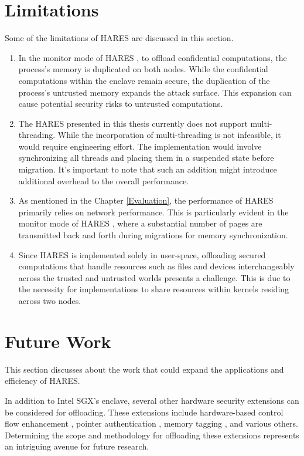 \documentclass[article, doublespace,nopageskip]{VTthesis} %
\newcommand{\monitor}{HARES }
\begin{document}
    \section{Limitations}
    Some of the limitations of \monitor are discussed in this section. 
    
    \begin{enumerate}
        \item In the monitor mode of \monitor, to offload confidential computations, the process's memory is duplicated on both nodes. While the confidential computations within the enclave remain secure, the duplication of the process's untrusted memory expands the attack surface. This expansion can cause potential security risks to untrusted computations.
        \item The \monitor presented in this thesis currently does not support multi-threading. While the incorporation of multi-threading is not infeasible, it would require engineering effort. The implementation would involve synchronizing all threads and placing them in a suspended state before migration. It's important to note that such an addition might introduce additional overhead to the overall performance.
        \item As mentioned in the Chapter \ref{Evaluation}, the performance of \monitor primarily relies on network performance. This is particularly evident in the monitor mode of \monitor, where a substantial number of pages are transmitted back and forth during migrations for memory synchronization.
        \item Since \monitor is implemented solely in user-space, offloading secured computations that handle resources such as files and devices interchangeably across the trusted and untrusted worlds presents a challenge. This is due to the necessity for implementations to share resources within kernels residing across two nodes.
    \end{enumerate}
    
    \section{Future Work}
    This section discusses about the work that could expand the applications and efficiency of HARES.

    In addition to Intel SGX's enclave, several other hardware security extensions can be considered for offloading. These extensions include hardware-based control flow enhancement \cite{intel_cet}, pointer authentication \cite{pointer_authentication}, memory tagging \cite{arm_mte}, and various others. Determining the scope and methodology for offloading these extensions represents an intriguing avenue for future research.
\end{document}
